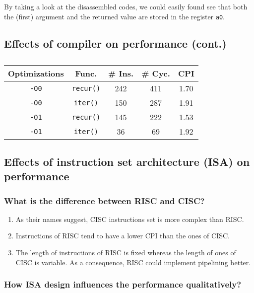 \documentclass[12pt, a4paper]{article}
\begin{document}
By taking a look at the disassembled codes, we could easily found see that both the (first) argument and the returned value are stored in the register \texttt{a0}.

\subsection{Effects of compiler on performance (cont.)}

\begin{table}[H]
\caption{}
\centering
\begin{tabular}{c||c|c|c|c}
Optimizations & Func. & \# Ins. & \# Cyc. & CPI \\
\hline\hline
\texttt{-O0} & \texttt{recur()} & 242 & 411 & 1.70 \\
\texttt{-O0} & \texttt{iter()} & 150 & 287 & 1.91 \\
\texttt{-O1} & \texttt{recur()} & 145 & 222 & 1.53 \\
\texttt{-O1} & \texttt{iter()} & 36 & 69 & 1.92
\end{tabular}
\label{tab:optimizations}
\end{table}

\subsection{Effects of instruction set architecture (ISA) on performance}

\subsubsection{What is the difference between RISC and CISC?}

\begin{enumerate}
\item As their names suggest, CISC instructions set is more complex than RISC.
\item Instructions of RISC tend to have a lower CPI than the ones of CISC.
\item The length of instructions of RISC is fixed whereas the length of ones of CISC is variable. As a consequence, RISC could implement pipelining better.
\end{enumerate}

\subsubsection{How ISA design influences the performance qualitatively?}
\end{document}
